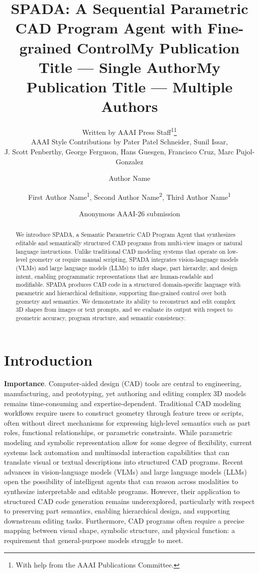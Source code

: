 \documentclass[letterpaper]{article} %
\title{SPADA: A Sequential Parametric CAD Program Agent with Fine-grained Control}
\author{
    Written by AAAI Press Staff\textsuperscript{\rm 1}\thanks{With help from the AAAI Publications Committee.}\\
    AAAI Style Contributions by Pater Patel Schneider,
    Sunil Issar,\\
    J. Scott Penberthy,
    George Ferguson,
    Hans Guesgen,
    Francisco Cruz\equalcontrib,
    Marc Pujol-Gonzalez\equalcontrib
}
\title{My Publication Title --- Single Author}
\author {
    Author Name
}
\title{My Publication Title --- Multiple Authors}
\author {
    First Author Name\textsuperscript{\rm 1},
    Second Author Name\textsuperscript{\rm 2},
    Third Author Name\textsuperscript{\rm 1}
}
\begin{document}
\author{
    Anonymous AAAI-26 submission
}

\maketitle

\begin{abstract}
    We introduce SPADA, a Semantic Parametric CAD Program Agent that synthesizes editable and semantically structured CAD programs from multi-view images or natural language instructions. Unlike traditional CAD modeling systems that operate on low-level geometry or require manual scripting, SPADA integrates vision-language models (VLMs) and large language models (LLMs) to infer shape, part hierarchy, and design intent, enabling programmatic representations that are human-readable and modifiable. SPADA produces CAD code in a structured domain-specific language with parametric and hierarchical definitions, supporting fine-grained control over both geometry and semantics. We demonstrate its ability to reconstruct and edit complex 3D shapes from images or text prompts, and we evaluate its output with respect to geometric accuracy, program structure, and semantic consistency.
\end{abstract}


\section{Introduction}

\textbf{Importance}. Computer-aided design (CAD) tools are central to engineering, manufacturing, and prototyping, yet authoring and editing complex 3D models remains time-consuming and expertise-dependent. Traditional CAD modeling workflows require users to construct geometry through feature trees or scripts, often without direct mechanisms for expressing high-level semantics such as part roles, functional relationships, or parametric constraints. While parametric modeling and symbolic representation allow for some degree of flexibility, current systems lack automation and multimodal interaction capabilities that can translate visual or textual descriptions into structured CAD programs. Recent advances in vision-language models (VLMs) and large language models (LLMs) open the possibility of intelligent agents that can reason across modalities to synthesize interpretable and editable programs. However, their application to structured CAD code generation remains underexplored, particularly with respect to preserving part semantics, enabling hierarchical design, and supporting downstream editing tasks. Furthermore, CAD programs often require a precise mapping between visual shape, symbolic structure, and physical function: a requirement that general-purpose models struggle to meet.
\end{document}
